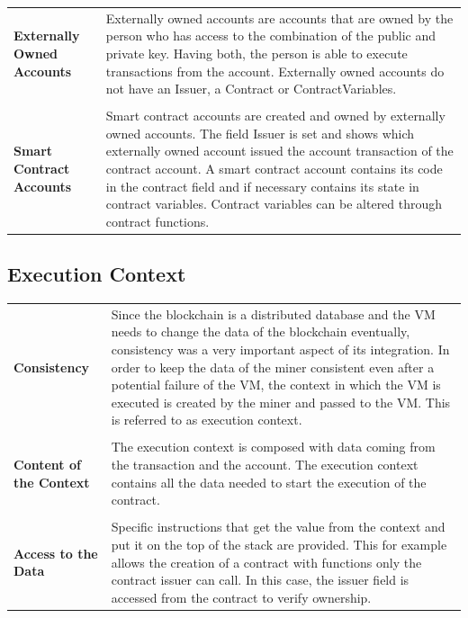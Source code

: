 \begin{tabular}[t]{ p{3cm} p{12.5cm}}
\raggedright
\textbf{Externally Owned Accounts} &
Externally owned accounts are accounts that are owned by the person who has access to the combination of the public and private key. Having both, the person is able to execute transactions from the account. Externally owned accounts do not have an Issuer, a Contract or ContractVariables. \\ \\
\textbf{Smart Contract Accounts} &
Smart contract accounts are created and owned by externally owned accounts. The field Issuer is set and shows which externally owned account issued the account transaction of the contract account. A smart contract account contains its code in the contract field and if necessary contains its state in contract variables. Contract variables can be altered through contract functions.
\end{tabular}

\subsection{Execution Context}
\begin{tabular}[t]{ p{3cm} p{12.5cm}}
\raggedright
\textbf{Consistency} &
Since the blockchain is a distributed database and the VM needs to change the data of the blockchain eventually, consistency was a very important aspect of its integration. In order to keep the data of the miner consistent even after a potential failure of the VM, the context in which the VM is executed is created by the miner and passed to the VM. This is referred to as execution context. \\ \\ %

\raggedright
\textbf{Content of the Context} &
The execution context is composed with data coming from the transaction and the account. The execution context contains all the data needed to start the execution of the contract. \\ \\ 

\raggedright
\textbf{Access to the Data} &
Specific instructions that get the value from the context and put it on the top of the stack are provided. This for example allows the creation of a contract with functions only the contract issuer can call. In this case, the issuer field is accessed from the contract to verify ownership.
\end{tabular}

